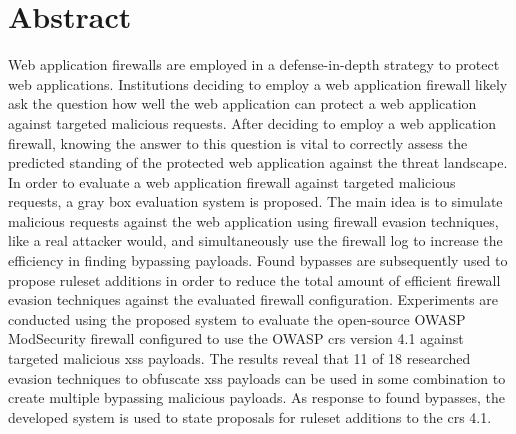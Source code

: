 \section{Abstract}
Web application firewalls are employed in a defense-in-depth strategy to protect web applications.
Institutions deciding to employ a web application firewall likely ask the question how well the web application can protect a web application against targeted malicious requests.
After deciding to employ a web application firewall, knowing the answer to this question is vital to correctly assess the predicted standing of the protected web application against the threat landscape.
In order to evaluate a web application firewall against targeted malicious requests, a gray box evaluation system is proposed. The main idea is to simulate malicious requests against the web application using firewall evasion techniques, like a real attacker would, and simultaneously use the firewall log to increase the efficiency in finding bypassing payloads.
Found bypasses are subsequently used to propose ruleset additions in order to reduce the total amount of efficient firewall evasion techniques against the evaluated firewall configuration.
Experiments are conducted using the proposed system to evaluate the open-source OWASP ModSecurity firewall configured to use the OWASP \acrfull{crs} version 4.1 against targeted malicious \acrfull{xss} payloads.
The results reveal that 11 of 18 researched evasion techniques to obfuscate \acrshort{xss} payloads can be used in some combination to create multiple bypassing malicious payloads.
As response to found bypasses, the developed system is used to state proposals for ruleset additions to the \acrshort{crs} 4.1.
